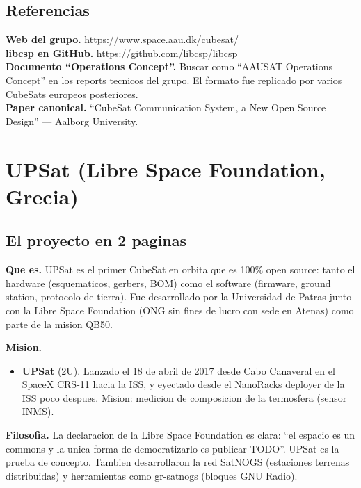 \documentclass[11pt,a4paper,oneside,openright]{book}
\begin{document}
\section{Referencias}

\begin{payloadbox}
\textbf{Web del grupo.}
\url{https://www.space.aau.dk/cubesat/}\\[0.3em]
\textbf{libcsp en GitHub.}
\url{https://github.com/libcsp/libcsp}\\[0.3em]
\textbf{Documento ``Operations Concept''.} Buscar como
``AAUSAT Operations Concept'' en los reports tecnicos del grupo. El
formato fue replicado por varios CubeSats europeos posteriores.\\[0.3em]
\textbf{Paper canonical.} ``CubeSat Communication System, a New Open
Source Design'' --- Aalborg University.
\end{payloadbox}

\chapter{UPSat (Libre Space Foundation, Grecia)}

\section{El proyecto en 2 paginas}

\textbf{Que es.} UPSat es el primer CubeSat en orbita que es 100\%
open source: tanto el hardware (esquematicos, gerbers, BOM) como el
software (firmware, ground station, protocolo de tierra). Fue
desarrollado por la Universidad de Patras junto con la Libre Space
Foundation (ONG sin fines de lucro con sede en Atenas) como parte de
la mision QB50.

\textbf{Mision.}
\begin{itemize}[leftmargin=2em]
  \item \textbf{UPSat} (2U). Lanzado el 18 de abril de 2017 desde Cabo
    Canaveral en el SpaceX CRS-11 hacia la ISS, y eyectado desde el
    NanoRacks deployer de la ISS poco despues. Mision: medicion de
    composicion de la termosfera (sensor INMS).
\end{itemize}

\textbf{Filosofia.} La declaracion de la Libre Space Foundation es
clara: ``el espacio es un commons y la unica forma de democratizarlo
es publicar TODO''. UPSat es la prueba de concepto. Tambien
desarrollaron la red SatNOGS (estaciones terrenas distribuidas) y
herramientas como gr-satnogs (bloques GNU Radio).
\end{document}

